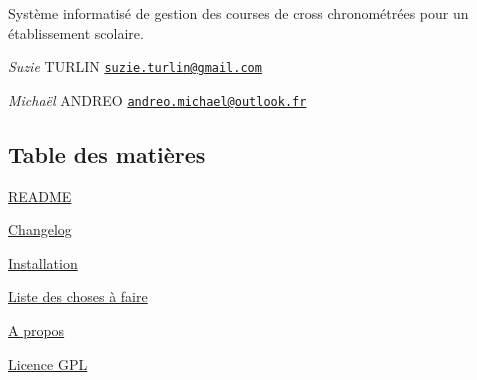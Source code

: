 Système informatisé de gestion des courses de cross chronométrées pour un établissement scolaire.

{\itshape Suzie} T\+U\+R\+L\+IN \href{mailto:suzie.turlin@gmail.com}{\tt suzie.\+turlin@gmail.\+com}

{\itshape Michaël} A\+N\+D\+R\+EO \href{mailto:andreo.michael@outlook.fr}{\tt andreo.\+michael@outlook.\+fr}\hypertarget{index_section_tdm}{}\subsection{Table des matières}\label{index_section_tdm}

\begin{DoxyItemize}
\item \hyperlink{page__r_e_a_d_m_e}{R\+E\+A\+D\+ME}
\item \hyperlink{page_changelog}{Changelog}
\item \hyperlink{page_install}{Installation}
\item \hyperlink{todo}{Liste des choses à faire}
\item \hyperlink{page_about}{A propos}
\item \hyperlink{page_licence}{Licence G\+PL} 
\end{DoxyItemize}